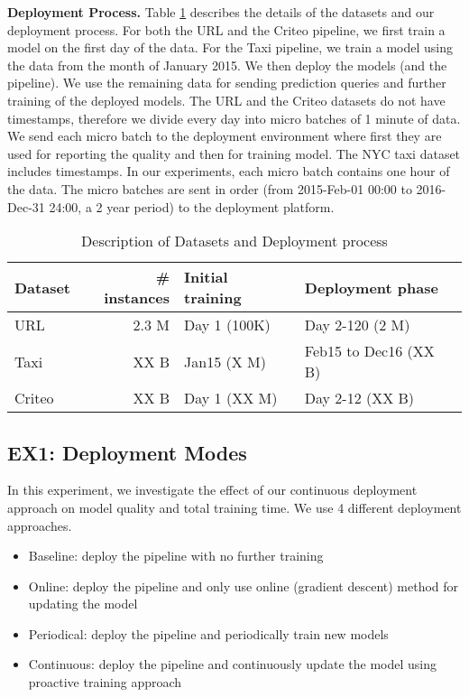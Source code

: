 \textbf{Deployment Process. }
Table \ref{dataset-description} describes the details of the datasets and our deployment process.
For both the URL and the Criteo pipeline, we first train a model on the first day of the data.
For the Taxi pipeline, we train a model using the data from the month of January 2015.
We then deploy the models (and the pipeline).
We use the remaining data for sending prediction queries and further training of the deployed models.
The URL and the Criteo datasets do not have timestamps, therefore we divide every day into micro batches of 1 minute of data. 
We send each micro batch to the deployment environment where first they are used for reporting the quality and then for training model.
The NYC taxi dataset includes timestamps. 
In our experiments, each micro batch contains one hour of the data. 
The micro batches are sent in order (from 2015-Feb-01  00:00 to 2016-Dec-31 24:00, a 2 year period) to the deployment platform.

\begin{table}[h!]
\centering
\begin{tabular}{lrll}
\hline
\textbf{Dataset}  & \textbf{\# instances} & \textbf{Initial training} & \textbf{Deployment phase} \\
\hline
URL             & 2.3 M           & Day 1 (100K)              & Day 2-120 (2 M)           \\
Taxi            & XX B              & Jan15 (X M)               & Feb15 to Dec16 (XX B)     \\
Criteo          & XX B            & Day 1 (XX M)              & Day 2-12 (XX B)        \\
\hline
\end{tabular}
\caption{Description of Datasets and Deployment process}  
\label{dataset-description}
\end{table}


\subsection{EX1: Deployment Modes}
In this experiment, we investigate the effect of our continuous deployment approach on model quality and total training time.
We use 4 different deployment approaches.
\begin{itemize}
\item Baseline: deploy the pipeline with no further training
\item Online: deploy the pipeline and only use online (gradient descent) method for updating the model
\item Periodical: deploy the pipeline and periodically train new models 
\item Continuous: deploy the pipeline and continuously update the model using proactive training approach
\end{itemize}

